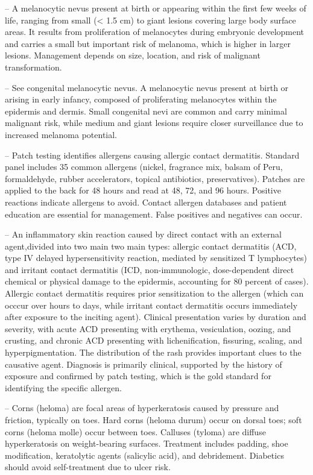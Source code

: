 -- A melanocytic nevus present at birth or appearing within the first few weeks of life, ranging from small (< 1.5 cm) to giant lesions covering large body surface areas. It results from proliferation of melanocytes during embryonic development and carries a small but important risk of melanoma, which is higher in larger lesions. Management depends on size, location, and risk of malignant transformation.

-- See congenital melanocytic nevus. A melanocytic nevus present at birth or arising in early infancy, composed of proliferating melanocytes within the epidermis and dermis. Small congenital nevi are common and carry minimal malignant risk, while medium and giant lesions require closer surveillance due to increased melanoma potential.

-- Patch testing identifies allergens causing allergic contact dermatitis. Standard panel includes 35 common allergens (nickel, fragrance mix, balsam of Peru, formaldehyde, rubber accelerators, topical antibiotics, preservatives). Patches are applied to the back for 48 hours and read at 48, 72, and 96 hours. Positive reactions indicate allergens to avoid. Contact allergen databases and patient education are essential for management. False positives and negatives can occur.

-- An inflammatory skin reaction caused by direct contact with an external agent,divided into two main two main types: allergic contact dermatitis (ACD, type IV delayed hypersensitivity reaction, mediated by sensitized T lymphocytes) and irritant contact dermatitis (ICD, non-immunologic, dose-dependent direct chemical or physical damage to the epidermis, accounting for 80 percent of cases). Allergic contact dermatitis requires prior sensitization to the allergen (which can occcur over hours to days, while irritant contact dermatitis occurs immediately after exposure to the inciting agent). Clinical presentation varies by duration and severity, with acute ACD presenting with erythema, vesiculation, oozing, and crusting, and chronic ACD presenting with lichenification, fissuring, scaling, and hyperpigmentation. The distribution of the rash provides important clues to the causative agent. Diagnosis is primarily clinical, supported by the history of exposure and confirmed by patch testing, which is the gold standard for identifying the specific allergen.

-- Corns (heloma) are focal areas of hyperkeratosis caused by pressure and friction, typically on toes. Hard corns (heloma durum) occur on dorsal toes; soft corns (heloma molle) occur between toes. Calluses (tyloma) are diffuse hyperkeratosis on weight-bearing surfaces. Treatment includes padding, shoe modification, keratolytic agents (salicylic acid), and debridement. Diabetics should avoid self-treatment due to ulcer risk.


